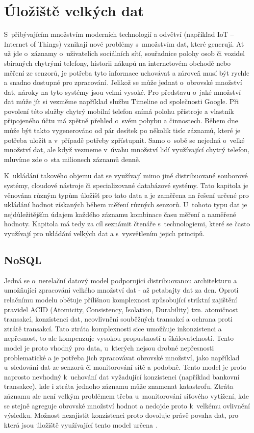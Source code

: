 \chapter{Úložiště velkých dat}\label{kap:storage}
S~přibývajícím množstvím moderních technologií a odvětví (například IoT -- Internet of Things) vznikají nové problémy s~množstvím dat, které generují. Ať už jde o~záznamy o~uživatelích sociálních sítí, souřadnice polohy osob či vozidel sbíraných chytrými telefony, historii nákupů na internetovém obchodě nebo měření ze senzorů, je potřeba tyto informace  uchovávat a zároveň musí být rychle a snadno dostupné pro zpracování. Jelikož se může jednat o~obrovské množství dat, nároky na tyto systémy jsou velmi vysoké. Pro představu o~jaké množství dat může jít si vezměme například službu Timeline od společnosti Google. Při povolení této služby chytrý mobilní telefon snímá polohu přístroje a vlastník připojeného účtu má zpětně přehled o~svém pohybu a činnostech. Během dne může být takto vygenerováno od pár desítek po několik tisíc záznamů, které je potřeba uložit a v~případě potřeby zpřístupnit. Samo o~sobě se nejedná o~velké množství dat, ale když vezmeme v~úvahu množství lidí využívající chytrý telefon, mluvíme zde o~sta milionech záznamů denně. 

K~ukládání takového objemu dat se využívají mimo jiné distribuované souborové systémy, cloudové nástroje či specializované databázové systémy. Tato kapitola je věnována různým typům úložišť pro tato data a je zaměřena na řešení určené pro ukládání hodnot získaných během měření různých senzorů. U~tohoto typu dat je nejdůležitějším údajem každého záznamu kombinace času měření a naměřené hodnoty. Kapitola má tedy za cíl seznámit čtenáře s~technologiemi, které se často využívají pro ukládání velkých dat a s~vysvětlením jejich principů.

\section{NoSQL}
Jedná se o~nerelační datový model podporující distribuovanou architekturu a umožňující zpracování velkého množství dat - až petabajty dat za den. Oproti relačnímu modelu obětuje přílišnou komplexnost způsobující striktní zajištění pravidel ACID (Atomicity, Consistency, Isolation, Durability) tzn. atomičnost transakcí, konzistenci dat, neovlivnění souběžných transakcí a ochrana proti ztrátě transakcí. Tato ztráta komplexnosti sice umožňuje inkonzistenci a nepřesnost, to ale kompenzuje vysokou propustností a škálovatelností. Tento model je proto vhodný pro data, u~kterých nejsou drobné nepřesnosti problematické a je potřeba jich zpracovávat obrovské množství, jako například u~sledování dat ze senzorů či monitorování sítě a podobně. Tento model je proto naprosto nevhodný k~uchování dat vyžadující konzistenci (například bankovní transakce), kde i ztráta jednoho záznamu může znamenat katastrofu. Ztráta záznamu ale není velkým problémem třeba u~monitorování síťového vytížení, kde se stejně agreguje obrovské množství hodnot a nedojde proto k~velkému ovlivnění výsledku. Možnost nezajistit konzistenci proto dovoluje právě povaha dat, pro která jsou úložiště využívající tento model určena \cite{NoSQL}.

